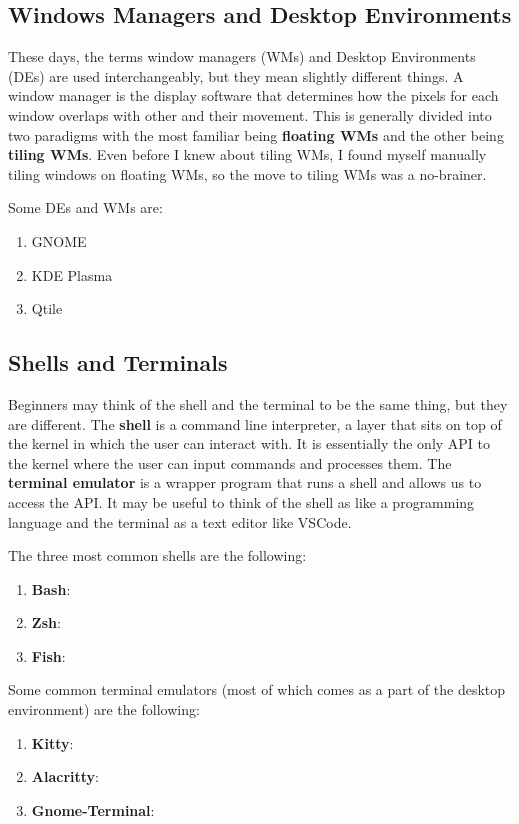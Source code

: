 \subsection{Windows Managers and Desktop Environments}

  These days, the terms window managers (WMs) and Desktop Environments (DEs) are used interchangeably, but they mean slightly different things. A window manager is the display software that determines how the pixels for each window overlaps with other and their movement. This is generally divided into two paradigms with the most familiar being \textbf{floating WMs} and the other being \textbf{tiling WMs}. Even before I knew about tiling WMs, I found myself manually tiling windows on floating WMs, so the move to tiling WMs was a no-brainer. 
  
  Some DEs and WMs are: 
  \begin{enumerate}
    \item GNOME 
    \item KDE Plasma
    \item Qtile
  \end{enumerate}

\subsection{Shells and Terminals}

  Beginners may think of the shell and the terminal to be the same thing, but they are different. The \textbf{shell} is a command line interpreter, a layer that sits on top of the kernel in which the user can interact with. It is essentially the only API to the kernel where the user can input commands and processes them. The \textbf{terminal emulator} is a wrapper program that runs a shell and allows us to access the API. It may be useful to think of the shell as like a programming language and the terminal as a text editor like VSCode. 

  The three most common shells are the following: 
  \begin{enumerate}
    \item \textbf{Bash}: 
    \item \textbf{Zsh}: 
    \item \textbf{Fish}:  
  \end{enumerate}

  Some common terminal emulators (most of which comes as a part of the desktop environment) are the following: 
  \begin{enumerate}
    \item \textbf{Kitty}: 
    \item \textbf{Alacritty}: 
    \item \textbf{Gnome-Terminal}: 
  \end{enumerate}

